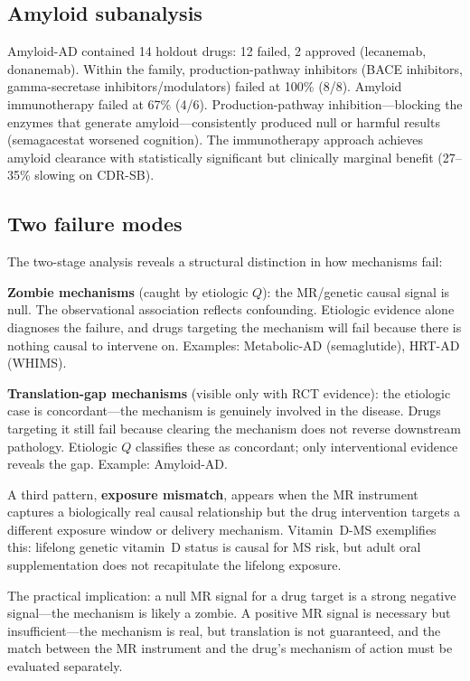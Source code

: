 \documentclass[11pt]{article}
\begin{document}
\subsection{Amyloid subanalysis}

Amyloid-AD contained 14 holdout drugs: 12 failed, 2 approved (lecanemab, donanemab). Within the family, production-pathway inhibitors (BACE inhibitors, gamma-secretase inhibitors/modulators) failed at 100\% (8/8). Amyloid immunotherapy failed at 67\% (4/6). Production-pathway inhibition---blocking the enzymes that generate amyloid---consistently produced null or harmful results (semagacestat worsened cognition). The immunotherapy approach achieves amyloid clearance with statistically significant but clinically marginal benefit (27--35\% slowing on CDR-SB).

\subsection{Two failure modes}
\label{sec:two_modes}

The two-stage analysis reveals a structural distinction in how mechanisms fail:

\textbf{Zombie mechanisms} (caught by etiologic $Q$): the MR/genetic causal signal is null. The observational association reflects confounding. Etiologic evidence alone diagnoses the failure, and drugs targeting the mechanism will fail because there is nothing causal to intervene on. Examples: Metabolic-AD (semaglutide), HRT-AD (WHIMS).

\textbf{Translation-gap mechanisms} (visible only with RCT evidence): the etiologic case is concordant---the mechanism is genuinely involved in the disease. Drugs targeting it still fail because clearing the mechanism does not reverse downstream pathology. Etiologic $Q$ classifies these as concordant; only interventional evidence reveals the gap. Example: Amyloid-AD.

A third pattern, \textbf{exposure mismatch}, appears when the MR instrument captures a biologically real causal relationship but the drug intervention targets a different exposure window or delivery mechanism. Vitamin~D-MS exemplifies this: lifelong genetic vitamin~D status is causal for MS risk, but adult oral supplementation does not recapitulate the lifelong exposure.

The practical implication: a null MR signal for a drug target is a strong negative signal---the mechanism is likely a zombie. A positive MR signal is necessary but insufficient---the mechanism is real, but translation is not guaranteed, and the match between the MR instrument and the drug's mechanism of action must be evaluated separately.
\end{document}
